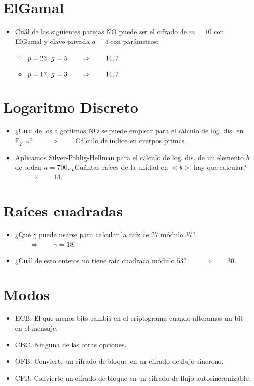 \documentclass[fleqn]{article}
\def\F{\mathds{F}}
\def\next{\qquad \Rightarrow \qquad}
\begin{document}
    \section{ElGamal}
    \begin{itemize}
        \item Cuál de las siguientes parejas NO puede ser el cifrado de $m = 10$ con ElGamal y clave privada $a = 4$ con parámetros:
                \begin{itemize}
                    \item $p = 23, \thinspace g = 5 \next 14,7$
                    \item $p = 17, \thinspace g = 3 \next 14,7$
                \end{itemize}
    \end{itemize}

    \section{Logaritmo Discreto}
    \begin{itemize}
        \item ¿Cual de los algoritmos NO se puede emplear para el cálculo de log. dis. en $\F_{2^{1024}}$? $\next $ Cálculo de índice en cuerpos primos.
        \item Aplicamos Silver-Pohlig-Hellman para el cálculo de log. dis. de un elemento $b$ de orden $n = 700$. ¿Cuántas raíces de la unidad en $<b>$ hay que calcular? $\next 14$.
    \end{itemize}

    \section{Raíces cuadradas}
    \begin{itemize}
        \item ¿Qué $\gamma$ puede usarse para calcular la raíz de 27 módulo 37? $\next \gamma = 18$. 
        \item ¿Cuál de esto enteros no tiene raíz cuadrada módulo 53? $\next 30$.
    \end{itemize}

    \section{Modos}
    \begin{itemize}
        \item ECB. El que menos bits cambia en el criptograma cuando alteramos un bit en el mensaje.
        \item CBC. Ninguna de las otras opciones.
        \item OFB. Convierte un cifrado de bloque en un cifrado de flujo síncrono.
        \item CFB. Convierte un cifrado de bloque en un cifrado de flujo autosincronizable.
    \end{itemize}
\end{document}
